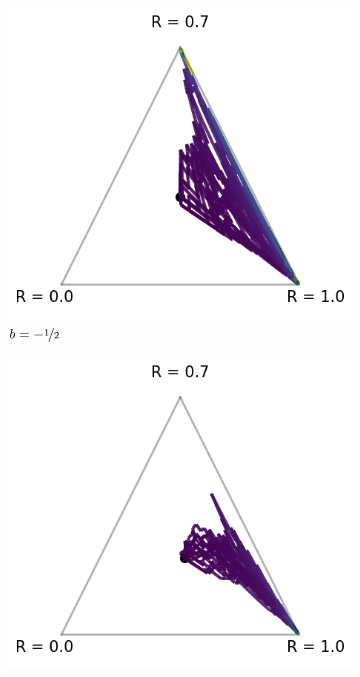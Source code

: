 \begin{figure}[!ht]
\centering
  \begin{subfigure}[b]{0.3\linewidth}
    \includegraphics[width=\textwidth]{articles/baselines/figs/escort_transform/escort_vanilla_minvar_-05.png}
    \caption{$b = - \nicefrac{1}{2}$}
  \end{subfigure}
    \begin{subfigure}[b]{0.3\linewidth}
    \includegraphics[width=\textwidth]{articles/baselines/figs/escort_transform/escort_vanilla_minvar_0.png}

\end{subfigure}
\end{figure}
